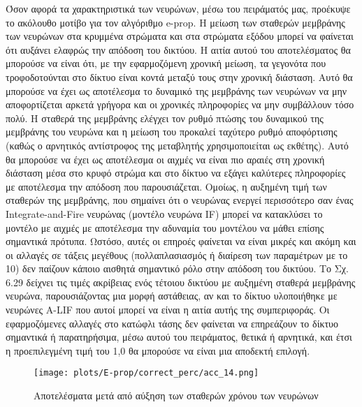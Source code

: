 \documentclass[12pt]{report}
\begin{document}
Όσον αφορά τα χαρακτηριστικά των νευρώνων, μέσω του πειράματός μας, προέκυψε το ακόλουθο μοτίβο για τον αλγόριθμο \textlatin{e-prop}. Η μείωση των σταθερών μεμβράνης των νευρώνων στα κρυμμένα στρώματα και στα στρώματα εξόδου μπορεί να φαίνεται ότι αυξάνει ελαφρώς την απόδοση του δικτύου. Η αιτία αυτού του αποτελέσματος θα μπορούσε να είναι ότι, με την εφαρμοζόμενη χρονική μείωση, τα γεγονότα που τροφοδοτούνται στο δίκτυο είναι κοντά μεταξύ τους στην χρονική διάσταση. Αυτό θα μπορούσε να έχει ως αποτέλεσμα το δυναμικό της μεμβράνης των νευρώνων να μην αποφορτίζεται αρκετά γρήγορα και οι χρονικές πληροφορίες να μην συμβάλλουν τόσο πολύ. Η σταθερά της μεμβράνης ελέγχει τον ρυθμό πτώσης του δυναμικού της μεμβράνης του νευρώνα και η μείωση του προκαλεί ταχύτερο ρυθμό αποφόρτισης (καθώς ο αρνητικός αντίστροφος της μεταβλητής χρησιμοποιείται ως εκθέτης). Αυτό θα μπορούσε να έχει ως αποτέλεσμα οι αιχμές να είναι πιο αραιές στη χρονική διάσταση μέσα στο κρυφό στρώμα και στο δίκτυο να εξάγει καλύτερες πληροφορίες με αποτέλεσμα την απόδοση που παρουσιάζεται. Ομοίως, η αυξημένη τιμή των σταθερών της μεμβράνης, που σημαίνει ότι ο νευρώνας ενεργεί περισσότερο σαν ένας \textlatin{Integrate-and-Fire} νευρώνας (μοντέλο νευρώνα \textlatin{IF}) μπορεί να κατακλύσει το μοντέλο με αιχμές με αποτέλεσμα την αδυναμία του μοντέλου να μάθει επίσης σημαντικά πρότυπα. Ωστόσο, αυτές οι επηροές φαίνεται να είναι μικρές και ακόμη και οι αλλαγές σε τάξεις μεγέθους (πολλαπλασιασμός ή διαίρεση των παραμέτρων με το 10) δεν παίζουν κάποιο αισθητά σημαντικό ρόλο στην απόδοση του δικτύου. Το Σχ. 6.29 δείχνει τις τιμές ακρίβειας ενός τέτοιου δικτύου με αυξημένη σταθερά μεμβράνης νευρώνα, παρουσιάζοντας μια μορφή αστάθειας, αν και το δίκτυο υλοποιήθηκε με νευρώνες \textlatin{A-LIF} που αυτοί μπορεί να είναι η αιτία αυτής της συμπεριφοράς. Οι εφαρμοζόμενες αλλαγές στο κατώφλι τάσης δεν φαίνεται να επηρεάζουν το δίκτυο σημαντικά ή παρατηρήσιμα, μέσω αυτού του πειράματος, θετικά ή αρνητικά, και έτσι η προεπιλεγμένη τιμή του 1,0 θα μπορούσε να είναι μια αποδεκτή επιλογή.

\begin{figure}[htp] %
    \centering
     \texttt{[image: plots/E-prop/correct\_perc/acc\_14.png]}
    \caption{Αποτελέσματα μετά από αύξηση των σταθερών χρόνου των νευρώνων}
    \label{fig:representation-methods}
\end{figure}
\end{document}
